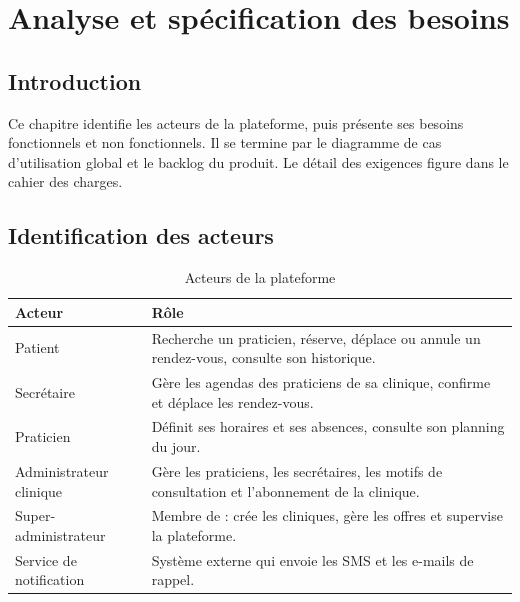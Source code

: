 \chapter{Analyse et spécification des besoins}\label{ch:besoins}

\section*{Introduction}
Ce chapitre identifie les acteurs de la plateforme, puis présente ses besoins fonctionnels et non fonctionnels. Il se termine par le diagramme de cas d'utilisation global et le backlog du produit. Le détail des exigences figure dans le cahier des charges.

\section{Identification des acteurs}
\begin{table}[H]\centering
\caption{Acteurs de la plateforme}\label{tab:acteurs}
\begin{tabularx}{\linewidth}{lX}
\toprule
\textbf{Acteur} & \textbf{Rôle} \\
\midrule
Patient & Recherche un praticien, réserve, déplace ou annule un rendez-vous, consulte son historique. \\
Secrétaire & Gère les agendas des praticiens de sa clinique, confirme et déplace les rendez-vous. \\
Praticien & Définit ses horaires et ses absences, consulte son planning du jour. \\
Administrateur clinique & Gère les praticiens, les secrétaires, les motifs de consultation et l'abonnement de la clinique. \\
Super-administrateur & Membre de \entreprise{} : crée les cliniques, gère les offres et supervise la plateforme. \\
Service de notification & Système externe qui envoie les SMS et les e-mails de rappel. \\
\bottomrule
\end{tabularx}
\end{table}


